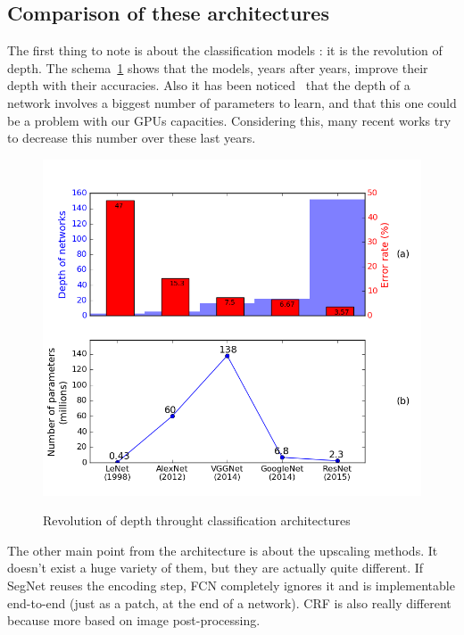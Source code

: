 \subsection{Comparison of these architectures} \label{1:comparison:comparison}
The first thing to note is about the classification models : it is the revolution of depth. The schema~\ref{fig:part1:comparison_archi_classification} shows that the models, years after years, improve their depth with their accuracies. Also it has been noticed~\cite{SIMO14, SZEG15, HE16} that the depth of a network involves a biggest number of parameters to learn, and that this one could be a problem with our GPUs capacities. Considering this, many recent works try to decrease this number over these last years.

\begin{figure}[ht!]
  \includegraphics[width=\linewidth,center]{images/part1/comparison_archi_classification.png}
  \caption{Revolution of depth throught classification architectures}\textbf{
  \label{fig:part1:comparison_archi_classification}}
\end{figure}

The other main point from the architecture is about the upscaling methods. It doesn't exist a huge variety of them, but they are actually quite different. If SegNet reuses the encoding step, FCN completely ignores it and is implementable end-to-end (just as a patch, at the end of a network). CRF is also really different because more based on image post-processing.




